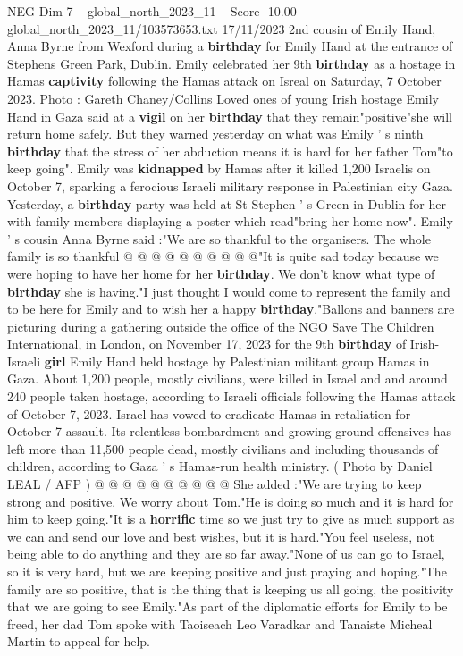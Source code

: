 \begin{textsample}{NEG Dim 7 – global\_north\_2023\_11 – Score -10.00 – global\_north\_2023\_11/103573653.txt}  \label{ex:f7_neg_050}
17/11/2023 2nd cousin of Emily Hand, Anna Byrne from Wexford during a \textbf{birthday} for Emily Hand at the entrance of Stephens Green Park, Dublin.
Emily celebrated her 9th \textbf{birthday} as a hostage in Hamas \textbf{captivity} following the Hamas attack on Isreal on Saturday, 7 October 2023.
Photo : Gareth Chaney/Collins Loved ones of young Irish hostage Emily Hand in Gaza said at a \textbf{vigil} on her \textbf{birthday} that they remain"positive"she will return home safely.
But they warned yesterday on what was Emily ' s ninth \textbf{birthday} that the stress of her abduction means it is hard for her father Tom"to keep going".
Emily was \textbf{kidnapped} by Hamas after it killed 1,200 Israelis on October 7, sparking a ferocious Israeli military response in Palestinian city Gaza.
Yesterday, a \textbf{birthday} party was held at St Stephen ' s Green in Dublin for her with family members displaying a poster which read"bring her home now".
Emily ' s cousin Anna Byrne said :"We are so thankful to the organisers.
The whole family is so thankful @ @ @ @ @ @ @ @ @ @"It is quite sad today because we were hoping to have her home for her \textbf{birthday}.
We don't know what type of \textbf{birthday} she is having."I just thought I would come to represent the family and to be here for Emily and to wish her a happy \textbf{birthday}."Ballons and banners are picturing during a gathering outside the office of the NGO Save The Children International, in London, on November 17, 2023 for the 9th \textbf{birthday} of Irish-Israeli \textbf{girl} Emily Hand held hostage by Palestinian militant group Hamas in Gaza.
About 1,200 people, mostly civilians, were killed in Israel and and around 240 people taken hostage, according to Israeli officials following the Hamas attack of October 7, 2023.
Israel has vowed to eradicate Hamas in retaliation for October 7 assault.
Its relentless bombardment and growing ground offensives has left more than 11,500 people dead, mostly civilians and including thousands of children, according to Gaza ' s Hamas-run health ministry. ( Photo by Daniel LEAL / AFP ) @ @ @ @ @ @ @ @ @ @ She added :"We are trying to keep strong and positive.
We worry about Tom."He is doing so much and it is hard for him to keep going."It is a \textbf{horrific} time so we just try to give as much support as we can and send our love and best wishes, but it is hard."You feel useless, not being able to do anything and they are so far away."None of us can go to Israel, so it is very hard, but we are keeping positive and just praying and hoping."The family are so positive, that is the thing that is keeping us all going, the positivity that we are going to see Emily."As part of the diplomatic efforts for Emily to be freed, her dad Tom spoke with Taoiseach Leo Varadkar and Tanaiste Micheal Martin to appeal for help.

\end{textsample}
